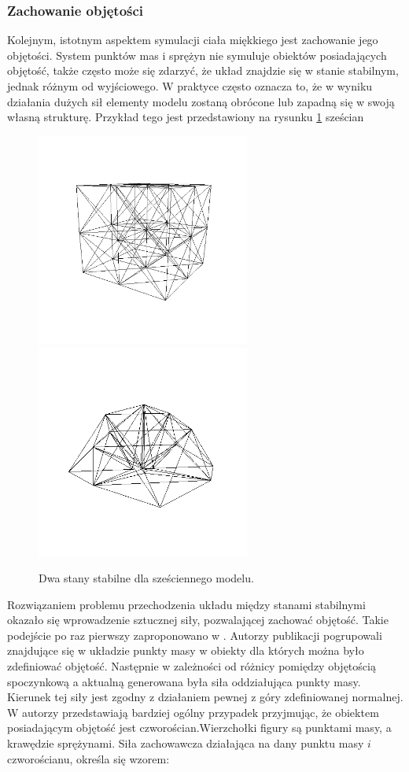 \subsubsection{Zachowanie objętości}
Kolejnym, istotnym aspektem symulacji ciała miękkiego jest zachowanie jego objętości. System punktów mas i sprężyn nie symuluje obiektów posiadających objętość, także często może się zdarzyć, że układ znajdzie się w stanie stabilnym, jednak różnym od wyjściowego. W praktyce często oznacza to, że w wyniku działania dużych sił elementy modelu zostaną obrócone lub zapadną się w swoją własną strukturę. Przykład tego jest przedstawiony na rysunku \ref{stany} sześcian 

\begin{figure}[ht]
\centering
\includegraphics[width=7cm, height=7cm]{images/stabilny.png}
\includegraphics[width=7cm, height=7cm]{images/niestabilny.png}
\caption{Dwa stany stabilne dla sześciennego modelu.}
\label{stany}
\end{figure}

Rozwiązaniem problemu przechodzenia układu między stanami stabilnymi okazało się wprowadzenie sztucznej siły, pozwalającej zachować objętość. Takie podejście po raz pierwszy zaproponowano w \cite{rmofa}. Autorzy publikacji pogrupowali znajdujące się w układzie punkty masy w obiekty dla których można było zdefiniować objętość. Następnie w zależności od różnicy pomiędzy objętością spoczynkową a aktualną generowana była siła oddziałująca punkty masy. Kierunek tej siły jest zgodny z działaniem pewnej z góry zdefiniowanej normalnej. W \cite{isodb} autorzy przedstawiają bardziej ogólny przypadek przyjmując, że obiektem posiadającym objętość jest czworościan.Wierzchołki figury są punktami masy, a krawędzie sprężynami. Siła zachowawcza działająca na dany punktu masy $i$ czworościanu, określa się wzorem:

